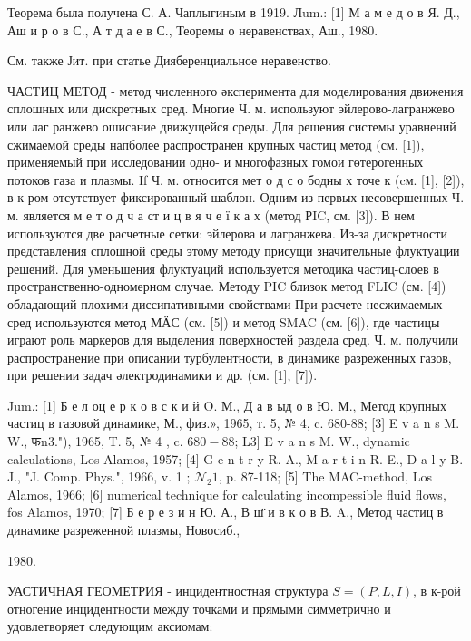 \documentclass[10pt]{article}
\begin{document}
Теорема была получена С. А. Чаплыгиным в 1919. Лum.: [1] М а м е д о в Я. Д., Аш и р о в С., А т д а е в С., Теоремы о неравенствах, Аш., 1980.



См. также Јит. при статье Дияберенциальное неравенство.



ЧАСТИЦ МЕТОД - метод численного әксперимента для моделирования движения сплошных или дискретных сред. Многие Ч. м. используют эйлерово-лагранжево или лаг ранжево ошисание движущейся среды. Для решения системы уравнений сжимаемой среды напболее распространен крупных частиц метод (см. [1]), применяемый при исследовании одно- и многофазных гомои гөтерогенных потоков газа и плазмы. If Ч. м. относится мет о д с о бодны х точе к (cм. [1], [2]), в к-ром отсутствует фиксированный шаблон. Одним из первых несовершенных Ч. м. является м е т о д ч а ст и ц в я ч е ї к а х (метод РIC, см. [3]). В нем используются две расчетные сетки: эйлерова и лагранжева. Из-за дискретности представления сплошной среды этому методу присущи значительные флуктуации решений. Для уменьшения флуктуаций используется методика частиц-слоев в пространственно-одномерном случае. Методу PIC близок метод FLIC (см. [4]) обладающий плохими диссипативными свойствами При расчете несжимаемых сред используются метод МӒС (см. [5]) и метод SMAC (см. [6]), где частицы играют роль маркеров для выделения поверхностей раздела сред. Ч. м. получили распространение при описании турбулентности, в динамике разреженных газов, при решении задач әлектродинамики и др. (см. [1], [7]).



Jum.: [1] Б е л оц е р к о в с к и й O. М., Д а в ыд о в Ю. М., Метод крупных частиц в газовой динамике, М., физ.», 1965, т. 5, № 4, c. 680-88; [3] E v a n s M. W., फn3."), 1965, T. 5, № 4 , c. $680-88$; L3] E v a n s M. W., dynamic calculations, Los Alamos, 1957; [4] G e n t r y R. A., M a r t i n R. E., D a l y B. J., "J. Comp. Phys.", 1966, v. 1 ; $\mathcal{N}_{2} 1$, p. 87-118; [5] The MAC-method, Los Alamos, 1966; [6] numerical technique for calculating incompessible fluid flows, fos Alamos, 1970; [7] Б е р е з и н Ю. А., В ш̈ и в к о в В. A., Метод частиц в динамике разреженной плазмы, Новосиб.,

1980.



УАСТИЧНАЯ ГЕОМЕТРИЯ - инцидентностная структура $S=(P, L, I)$, в к-рой отногение инцидентности между точками и прямыми симметрично и удовлетворяет следующим аксиомам:
\end{document}
